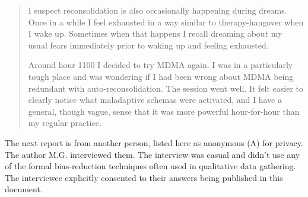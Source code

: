\documentclass[12pt,letterpaper]{book}
\begin{document}
\begin{quotation}
    I suspect reconsolidation is also occasionally happening during dreams. Once in a while I feel exhausted in a way similar to therapy-hangover when I wake up. Sometimes when that happens I recall dreaming about my usual fears immediately prior to waking up and feeling exhausted.

    Around hour 1100 I decided to try MDMA again. I was in a particularly tough place and was wondering if I had been wrong about MDMA being redundant with auto-reconsolidation. The session went well. It felt easier to clearly notice what maladaptive schemas were activated, and I have a general, though vague, sense that it was more powerful hour-for-hour than my regular practice.
\end{quotation}
The next report is from another person, listed here as anonymous (A) for privacy. The author M.G. interviewed them. The interview was casual and didn't use any of the formal bias-reduction techniques often used in qualitative data gathering. The interviewee explicitly consented to their answers being published in this document.
\end{document}
